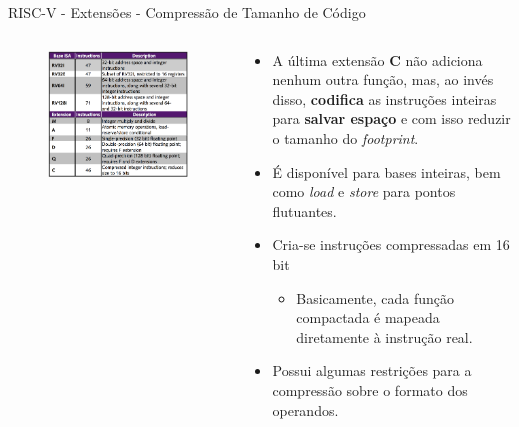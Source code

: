 \documentclass[aspectratio=169]{beamer}
\begin{document}
\begin{frame}{RISC-V - Extensões - Compressão de Tamanho de Código}
	\begin{columns}
		\begin{column}{0.58\textwidth}
			\begin{figure}
				\centering
				\label{fig:bi2}
				\includegraphics[width=1\textwidth]{img/base-instruction.png}
			\end{figure}
		\end{column}
		\begin{column}{0.55\textwidth}
			\begin{itemize}
				\item A última extensão \textbf{C} não adiciona nenhum outra função, mas, ao invés disso, \textbf{codifica} as instruções inteiras para \textbf{salvar espaço} e com isso reduzir o tamanho do \textit{footprint}.
				\item É disponível para bases inteiras, bem como \textit{load} e \textit{store} para pontos flutuantes.
				\item Cria-se instruções compressadas em 16 bit
				\begin{itemize}
					\item Basicamente, cada função compactada é mapeada diretamente à instrução real.
				\end{itemize}
				\item Possui algumas restrições para a compressão sobre o formato dos operandos.
			\end{itemize}
		\end{column}
	\end{columns}
\end{frame}
\end{document}
